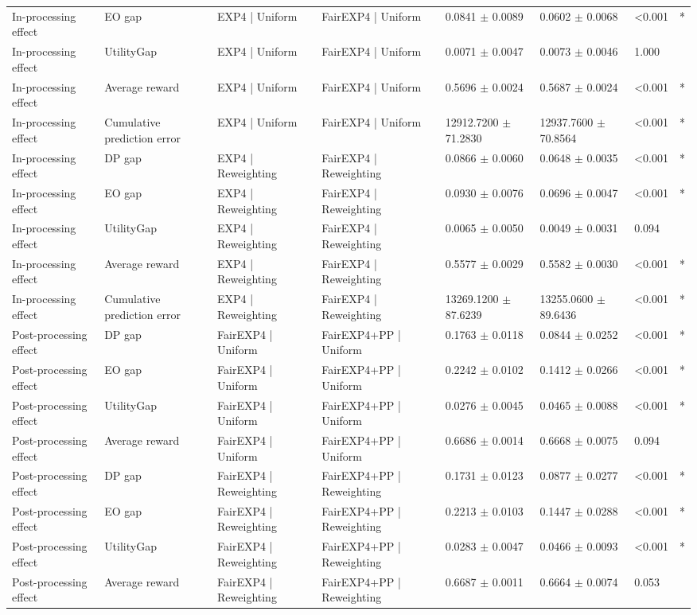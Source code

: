 \begin{table}[htbp]
{\begin{tabular}{llllllll}
In-processing effect & EO gap & EXP4 | Uniform & FairEXP4 | Uniform & 0.0841 $\pm$ 0.0089 & 0.0602 $\pm$ 0.0068 & <0.001 & * \\
In-processing effect & UtilityGap & EXP4 | Uniform & FairEXP4 | Uniform & 0.0071 $\pm$ 0.0047 & 0.0073 $\pm$ 0.0046 & 1.000 &  \\
In-processing effect & Average reward & EXP4 | Uniform & FairEXP4 | Uniform & 0.5696 $\pm$ 0.0024 & 0.5687 $\pm$ 0.0024 & <0.001 & * \\
In-processing effect & Cumulative prediction error & EXP4 | Uniform & FairEXP4 | Uniform & 12912.7200 $\pm$ 71.2830 & 12937.7600 $\pm$ 70.8564 & <0.001 & * \\
In-processing effect & DP gap & EXP4 | Reweighting & FairEXP4 | Reweighting & 0.0866 $\pm$ 0.0060 & 0.0648 $\pm$ 0.0035 & <0.001 & * \\
In-processing effect & EO gap & EXP4 | Reweighting & FairEXP4 | Reweighting & 0.0930 $\pm$ 0.0076 & 0.0696 $\pm$ 0.0047 & <0.001 & * \\
In-processing effect & UtilityGap & EXP4 | Reweighting & FairEXP4 | Reweighting & 0.0065 $\pm$ 0.0050 & 0.0049 $\pm$ 0.0031 & 0.094 &  \\
In-processing effect & Average reward & EXP4 | Reweighting & FairEXP4 | Reweighting & 0.5577 $\pm$ 0.0029 & 0.5582 $\pm$ 0.0030 & <0.001 & * \\
In-processing effect & Cumulative prediction error & EXP4 | Reweighting & FairEXP4 | Reweighting & 13269.1200 $\pm$ 87.6239 & 13255.0600 $\pm$ 89.6436 & <0.001 & * \\
Post-processing effect & DP gap & FairEXP4 | Uniform & FairEXP4+PP | Uniform & 0.1763 $\pm$ 0.0118 & 0.0844 $\pm$ 0.0252 & <0.001 & * \\
Post-processing effect & EO gap & FairEXP4 | Uniform & FairEXP4+PP | Uniform & 0.2242 $\pm$ 0.0102 & 0.1412 $\pm$ 0.0266 & <0.001 & * \\
Post-processing effect & UtilityGap & FairEXP4 | Uniform & FairEXP4+PP | Uniform & 0.0276 $\pm$ 0.0045 & 0.0465 $\pm$ 0.0088 & <0.001 & * \\
Post-processing effect & Average reward & FairEXP4 | Uniform & FairEXP4+PP | Uniform & 0.6686 $\pm$ 0.0014 & 0.6668 $\pm$ 0.0075 & 0.094 &  \\
Post-processing effect & DP gap & FairEXP4 | Reweighting & FairEXP4+PP | Reweighting & 0.1731 $\pm$ 0.0123 & 0.0877 $\pm$ 0.0277 & <0.001 & * \\
Post-processing effect & EO gap & FairEXP4 | Reweighting & FairEXP4+PP | Reweighting & 0.2213 $\pm$ 0.0103 & 0.1447 $\pm$ 0.0288 & <0.001 & * \\
Post-processing effect & UtilityGap & FairEXP4 | Reweighting & FairEXP4+PP | Reweighting & 0.0283 $\pm$ 0.0047 & 0.0466 $\pm$ 0.0093 & <0.001 & * \\
Post-processing effect & Average reward & FairEXP4 | Reweighting & FairEXP4+PP | Reweighting & 0.6687 $\pm$ 0.0011 & 0.6664 $\pm$ 0.0074 & 0.053 &  \\
\bottomrule
\end{tabular}
}%
\end{table}

